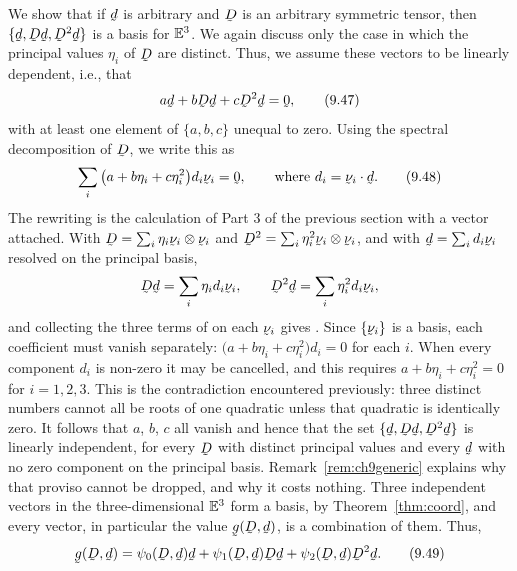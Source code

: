 We show that if $\bd$ is arbitrary and $\bD$ is an arbitrary symmetric
tensor, then $\{\bd,\bD\bd,\bD^{2}\bd\}$ is a basis for $\mathbb{E}^{3}$. We again
discuss only the case in which the principal values $\eta_{i}$ of $\bD$
are distinct. Thus, we assume these vectors to be linearly dependent,
i.e., that
\begin{equation}
   a\bd+b\bD\bd+c\bD^{2}\bd=\bze,
   \tag{9.47}\label{eq:9.47}
\end{equation}
with at least one element of $\{a,b,c\}$ unequal to zero. Using the
spectral decomposition of $\bD$, we write this as
\begin{equation}
   \sum_{i}\big(a+b\eta_{i}+c\eta_{i}^{2}\big)d_{i}\bnu_{i}=\bze,
   \qquad\text{where }d_{i}=\ip{\bnu_{i}}\bd .
   \tag{9.48}\label{eq:9.48}
\end{equation}
The rewriting is the calculation of Part 3 of the previous section with
a vector attached. With $\bD=\sum_{i}\eta_{i}\bnu_{i}\otimes\bnu_{i}$
and $\bD^{2}=\sum_{i}\eta_{i}^{2}\bnu_{i}\otimes\bnu_{i}$, and with
$\bd=\sum_{i}d_{i}\bnu_{i}$ resolved on the principal basis,
\[
   \bD\bd=\sum_{i}\eta_{i}d_{i}\bnu_{i},
   \qquad
   \bD^{2}\bd=\sum_{i}\eta_{i}^{2}d_{i}\bnu_{i},
\]
and collecting the three terms of  on each $\bnu_{i}$ gives
. Since $\{\bnu_{i}\}$ is a basis, each coefficient must
vanish separately:
$\big(a+b\eta_{i}+c\eta_{i}^{2}\big)d_{i}=0$ for each $i$. When every
component $d_{i}$ is non-zero it may be cancelled, and this requires
$a+b\eta_{i}+c\eta_{i}^{2}=0$ for $i=1,2,3$. This is the contradiction
encountered previously: three distinct numbers cannot all be roots of
one quadratic unless that quadratic is identically zero. It follows that
$a$, $b$, $c$ all vanish and hence that the set
$\{\bd,\bD\bd,\bD^{2}\bd\}$ is linearly independent, for every $\bD$
with distinct principal values and every $\bd$ with no zero component on
the principal basis. Remark~\ref{rem:ch9generic} explains why that
proviso cannot be dropped, and why it costs nothing. Three independent
vectors in the three-dimensional $\mathbb{E}^{3}$ form a basis, by
Theorem~\ref{thm:coord}, and every vector, in particular the value
$\bg(\bD,\bd)$, is a combination of them. Thus,
\begin{equation}
   \bg(\bD,\bd)=\psi_{0}(\bD,\bd)\bd+\psi_{1}(\bD,\bd)\bD\bd
   +\psi_{2}(\bD,\bd)\bD^{2}\bd .
   \tag{9.49}\label{eq:9.49}
\end{equation}

